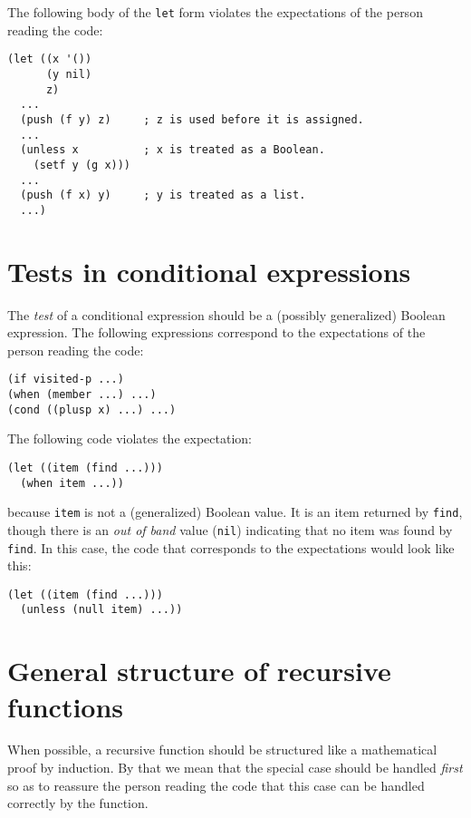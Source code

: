 The following body of the \texttt{let} form violates the expectations
of the person reading the code:

\begin{verbatim}
(let ((x '())
      (y nil)
      z)
  ...
  (push (f y) z)     ; z is used before it is assigned.
  ...
  (unless x          ; x is treated as a Boolean.
    (setf y (g x)))
  ...
  (push (f x) y)     ; y is treated as a list.
  ...)
\end{verbatim}

\section{Tests in conditional expressions}

The \emph{test} of a conditional expression should be a (possibly
generalized) Boolean expression.  The following expressions correspond
to the expectations of the person reading the code:

\begin{verbatim}
(if visited-p ...)
(when (member ...) ...)
(cond ((plusp x) ...) ...)
\end{verbatim}

The following code violates the expectation:

\begin{verbatim}
(let ((item (find ...)))
  (when item ...))
\end{verbatim}

because \texttt{item} is not a (generalized) Boolean value.  It is an
item returned by \texttt{find}, though there is an \emph{out of band}
value (\texttt{nil}) indicating that no item was found by
\texttt{find}.  In this case, the code that corresponds
to the expectations would look like this:

\begin{verbatim}
(let ((item (find ...)))
  (unless (null item) ...))
\end{verbatim}

\section{General structure of recursive functions}

When possible, a recursive function should be structured like a
mathematical proof by induction.  By that we mean that the special
case should be handled \emph{first} so as to reassure the person
reading the code that this case can be handled correctly by the
function.


